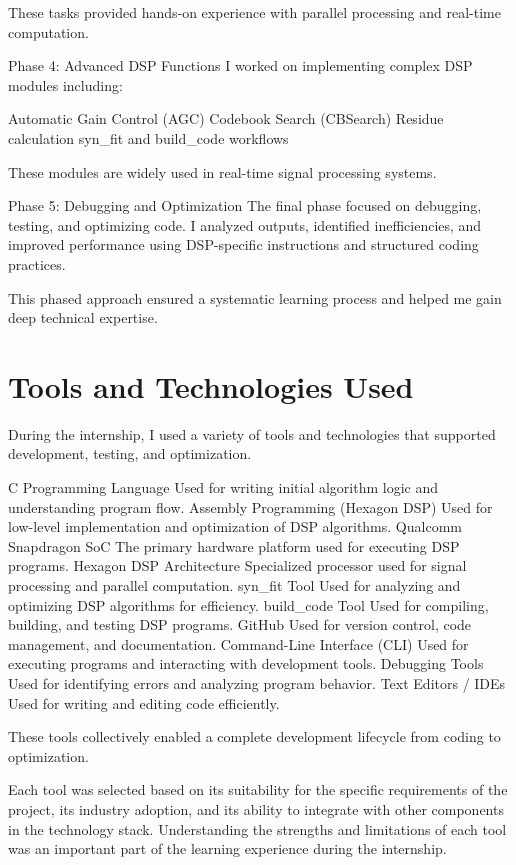 \documentclass[12pt,a4paper]{report}
\begin{document}
These tasks provided hands-on experience with parallel processing and real-time computation.


Phase 4: Advanced DSP Functions I worked on implementing complex DSP modules including:


Automatic Gain Control (AGC) Codebook Search (CBSearch) Residue calculation syn\_fit and build\_code workflows


These modules are widely used in real-time signal processing systems.


Phase 5: Debugging and Optimization The final phase focused on debugging, testing, and optimizing code. I analyzed outputs, identified inefficiencies, and improved performance using DSP-specific instructions and structured coding practices.


This phased approach ensured a systematic learning process and helped me gain deep technical expertise.


\section{Tools and Technologies Used}

During the internship, I used a variety of tools and technologies that supported development, testing, and optimization.


C Programming Language Used for writing initial algorithm logic and understanding program flow. Assembly Programming (Hexagon DSP) Used for low-level implementation and optimization of DSP algorithms. Qualcomm Snapdragon SoC The primary hardware platform used for executing DSP programs. Hexagon DSP Architecture Specialized processor used for signal processing and parallel computation. syn\_fit Tool Used for analyzing and optimizing DSP algorithms for efficiency. build\_code Tool Used for compiling, building, and testing DSP programs. GitHub Used for version control, code management, and documentation. Command-Line Interface (CLI) Used for executing programs and interacting with development tools. Debugging Tools Used for identifying errors and analyzing program behavior. Text Editors / IDEs Used for writing and editing code efficiently.


These tools collectively enabled a complete development lifecycle from coding to optimization.


Each tool was selected based on its suitability for the specific requirements of the project, its industry adoption, and its ability to integrate with other components in the technology stack. Understanding the strengths and limitations of each tool was an important part of the learning experience during the internship.
\end{document}
